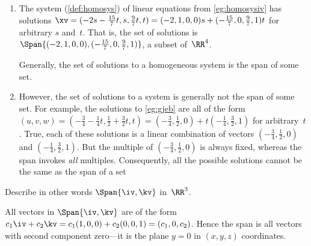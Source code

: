 \begin{example}
\begin{enumerate}
\item The  system (\cref{def:homosys}) of linear equations from \cref{eg:homosysiv} has solutions \(\xv=(-2s-\frac{15}7t,s,\frac97t,t) =(-2,1,0,0)s+(-\frac{15}7,0,\frac97,1)t\) for arbitrary \(s\) and~\(t\).
That is, the set of solutions is \(\Span\{(-2,1,0,0),\linebreak[1](-\frac{15}7,0,\frac97,1)\}\), a subset of~\(\RR^4\).

Generally, the set of solutions to a homogeneous system is the span of some set.

\item However, the set of solutions to a  system is generally not the span of some set.  
For example, the solutions to \cref{eg:gjeb} are all of the form \((u,v,w)=(-\frac34-\frac14t,\frac12+\frac32t,t) 
=(-\frac34,\frac12,0)+t(-\frac14,\frac32,1)\) for arbitrary~\(t\).
True, each of these solutions is a linear combination of vectors \((-\frac34,\frac12,0)\) and \((-\frac14,\frac32,1)\). 
But the multiple of \((-\frac34,\frac12,0)\) is always fixed, whereas the span invokes \emph{all} multiples.
Consequently, all the possible solutions cannot be the same as the span of a set 

\end{enumerate}
\end{example}


\begingroup
\def\temp{\begin{tikzpicture}[]
\begin{axis}[footnotesize,font=\footnotesize
    , axis equal, axis lines=middle,
    , xlabel={$x$},ylabel={$y$},  grid
    ]
     ;
\end{axis}
\end{tikzpicture}}
\endgroup



\begin{example} 
Describe in other words \(\Span\{\iv,\kv\}\) in~\(\RR^3\).

\begin{solution} 
All vectors in \(\Span\{\iv,\kv\}\) are of the form
\(c_1\iv+c_2\kv
=c_1(1,0,0)+c_2(0,0,1)
=(c_1,0,c_2)\).
Hence the span is all vectors with second component zero---it is the plane \(y=0\) in \((x,y,z)\) coordinates.
\end{solution}
\end{example}



